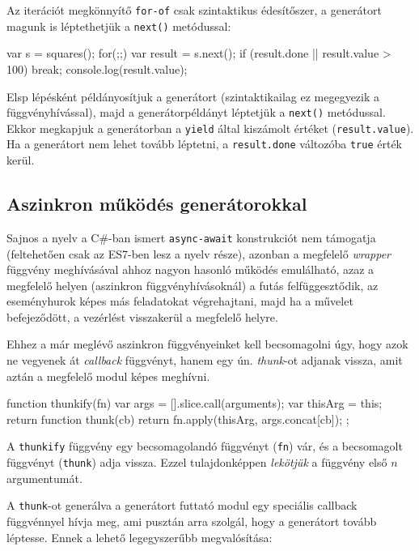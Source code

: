 Az iterációt megkönnyítő \verb=for-of= csak szintaktikus édesítőszer,
a generátort magunk is léptethetjük a \verb=next()= metódussal:

\begin{js}
var s = squares();
for(;;) {
  var result = s.next();
  if (result.done || result.value > 100) {
    break;
  }
  console.log(result.value);
}
\end{js}

Elsp lépésként példányosítjuk a generátort (szintaktikailag ez megegyezik
a függvényhívással), majd a generátorpéldányt léptetjük a \verb=next()=
metódussal. Ekkor megkapjuk a generátorban a \verb=yield= által kiszámolt
értéket (\verb=result.value=). Ha a generátort nem lehet tovább léptetni,
a \verb=result.done= változóba \verb=true= érték kerül.

\subsection{Aszinkron működés generátorokkal}\label{sec:async}

Sajnos a nyelv a C\#-ban ismert \verb=async-await= konstrukciót nem támogatja
(feltehetően csak az ES7-ben lesz a nyelv része),
azonban a megfelelő \emph{wrapper} függvény meghívásával ahhoz nagyon hasonló
működés emulálható, azaz a megfelelő helyen (aszinkron függvényhívásoknál)
a futás felfüggesztődik, az eseményhurok képes más feladatokat végrehajtani,
majd ha a művelet befejeződött, a vezérlést visszakerül a megfelelő helyre.

Ehhez a már meglévő aszinkron függvényeinket kell becsomagolni úgy,
hogy azok ne vegyenek át \emph{callback} függvényt, hanem egy ún.
\emph{thunk}-ot adjanak vissza, amit aztán a megfelelő modul képes meghívni.

\begin{js}
function thunkify(fn) {
  var args = [].slice.call(arguments);
  var thisArg = this;
  return function thunk(cb) {
    return fn.apply(thisArg, args.concat[cb]);
  };
}
\end{js}

A \verb=thunkify= függvény egy becsomagolandó függvényt (\verb=fn=) vár,
és a becsomagolt függvényt (\verb=thunk=) adja vissza. Ezzel tulajdonképpen
\emph{lekötjük} a függvény első $n$ argumentumát.

A \verb=thunk=-ot generálva a generátort futtató modul egy speciális
callback függvénnyel hívja meg, ami pusztán arra szolgál,
hogy a generátort tovább léptesse.
Ennek a lehető legegyszerűbb megvalósítása:

